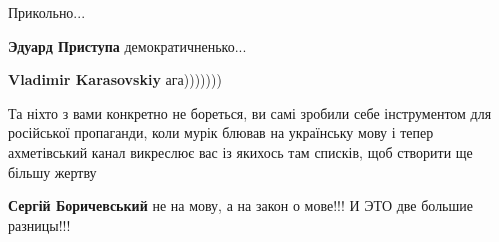 \begin{itemize}
 
Прикольно...

\begin{itemize}
 
\textbf{Эдуард Приступа} демократичненько...

 
\textbf{Vladimir Karasovskiy} ага)))))))
\end{itemize}

 

Та ніхто з вами конкретно не бореться, ви самі зробили себе інструментом для
російської пропаганди, коли мурік блював на українську мову і тепер
ахметівський канал викреслює вас із якихось там списків, щоб створити ще більшу
жертву

\begin{itemize}
 
\textbf{Сергій Боричевський} не на мову, а на закон о мове!!! И ЭТО две большие разницы!!!

 

\end{itemize}
\end{itemize}
